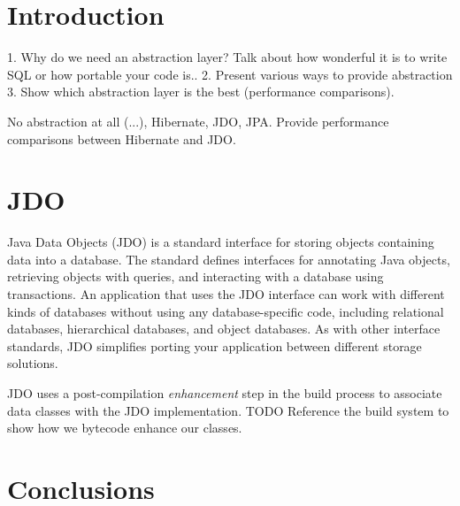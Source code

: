 \documentclass[12pt]{article}
\begin{document}
\maketitle

\section{Introduction}

1. Why do we need an abstraction layer? Talk about how wonderful it is to write SQL or how portable your code is..
2. Present various ways to provide abstraction
3. Show which abstraction layer is the best (performance comparisons).

No abstraction at all (...), Hibernate, JDO, JPA. Provide performance comparisons between Hibernate and JDO. 

\section{JDO}

Java Data Objects (JDO) is a standard interface for storing objects containing data into a database. The standard defines interfaces for annotating Java objects, retrieving objects with queries, and interacting with a database using transactions. An application that uses the JDO interface can work with different kinds of databases without using any database-specific code, including relational databases, hierarchical databases, and object databases. As with other interface standards, JDO simplifies porting your application between different storage solutions.

JDO uses a post-compilation \emph{enhancement} step in the build process to associate data classes with the JDO implementation. TODO Reference the build system to show how we bytecode enhance our classes.

\section{Conclusions}
\end{document}
